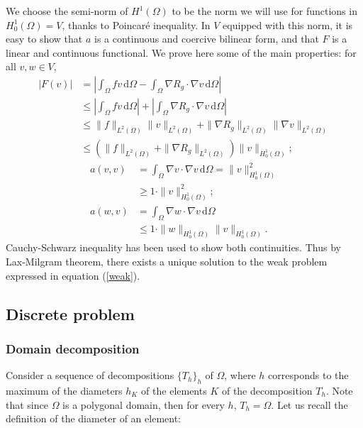 We choose the semi-norm of $H^1(\Omega)$ to be the norm we will use for functions in $H^1_0(\Omega) = V$, thanks to Poincaré inequality. In $V$ equipped with this norm, it is easy to show that $a$ is a continuous and coercive bilinear form, and that $F$ is a linear and continuous functional. We prove here some of the main properties: for all $v,w\in V$, 
\begin{align*}
\left|F(v)\right| &= \left|\int_\Omega fv \, \mathrm{d}\Omega -\int_\Omega \nabla R_g \cdot \nabla v \, \mathrm{d} \Omega\right| \\
& \leq \left|\int_\Omega fv \, \mathrm{d}\Omega\right| + \left|\int_\Omega \nabla R_g \cdot \nabla v \, \mathrm{d} \Omega\right|\\
& \leq \|f\|_{L^2(\Omega)}\|v\|_{L^2(\Omega)} + \|\nabla R_g\|_{L^2(\Omega)}\|\nabla v\|_{L^2(\Omega)}\\
& \leq \left(\|f\|_{L^2(\Omega)}+\|\nabla R_g\|_{L^2(\Omega)}\right)\|v\|_{H_0^1(\Omega)};
\end{align*}
\begin{align}
a(v,v) &= \int_\Omega \nabla v \cdot \nabla v \, \mathrm{d} \Omega = \|v\|^2_{H_0^1(\Omega)} \nonumber \\
& \geq 1\cdot \|v\|^2_{H_0^1(\Omega)}; \label{acoercive}\\
a(w,v) &= \int_\Omega \nabla w \cdot \nabla v \, \mathrm{d} \Omega \nonumber \\
& \leq 1 \cdot \|w\|_{H_0^1(\Omega)}\|v\|_{H_0^1(\Omega)}.\label{acontinue}
\end{align} 
Cauchy-Schwarz inequality has been used to show both continuities. Thus by Lax-Milgram theorem, there exists a unique solution to the weak problem expressed in equation (\ref{weak}). 


\subsection{Discrete problem}

\subsubsection{Domain decomposition}
Consider a sequence of decompositions $\{T_h\}_h$ of $\Omega$, where $h$ corresponds to the maximum of the diameters $h_K$ of the elements $K$ of the decomposition $T_h$. Note that since $\Omega$ is a polygonal domain, then for every $h$, $T_h = \Omega$. Let us recall the definition of the diameter of an element: 

